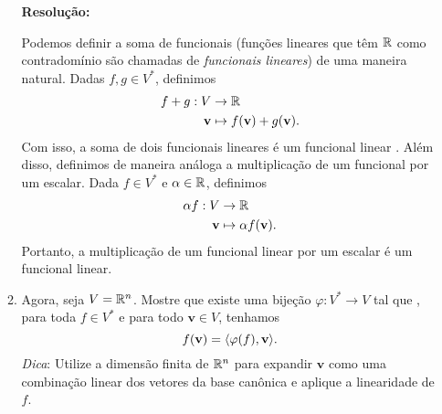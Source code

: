 \documentclass[leqno]{article}
\numberwithin{equation}{section}
\newcommand{\bfv}{\mathbf{v}}
\newenvironment{sol}
{
    \vspace{4mm}
    \noindent\textbf{Resolução:}
    \strut\newline
    \smallskip
    \hspace{-3.5mm}
}
{}
\begin{document}
\begin{enumerate}
\begin{enumerate}
                \begin{sol} 
                    Podemos definir a soma de funcionais (funções lineares que têm \( \mathbb{R} \) como contradomínio são chamadas de \textit{funcionais lineares}) de uma maneira natural.
                    Dadas \( f, g \in V^{ * } \), definimos
                    \begin{align*}
                        f + g : V &\to \R \\
                        \bfv &\mapsto f ( \bfv ) + g ( \bfv )
                    .\end{align*}
                \end{sol} 
                Com isso, a soma de dois funcionais lineares é um funcional linear .
                Além disso, definimos de maneira análoga a multiplicação de um funcional por um escalar.
                Dada \( f \in V^{ * } \) e \( \alpha \in \mathbb{R} \), definimos
                \begin{align*}
                    \alpha f : V &\to \R \\
                    \bfv &\mapsto \alpha f ( \bfv )
                .\end{align*}
                Portanto, a multiplicação de um funcional linear por um escalar é um funcional linear.

            \item Agora, seja \( V = \mathbb{R}^{ n } \).
                Mostre que existe uma bijeção \( \varphi : V^{ * } \to V \) tal que , para toda \( f \in V^{ * } \) e para todo \( \bfv \in V \), tenhamos
                \begin{equation*}
                    f(\bfv) = \dotprod{\varphi(f), \bfv}
                .\end{equation*}
                \textit{Dica}: Utilize a dimensão finita de \( \mathbb{R}^{ n } \) para expandir \( \bfv \) como uma combinação linear dos vetores da base canônica e aplique a linearidade de \( f \).


\end{enumerate}
\end{enumerate}
\end{document}
